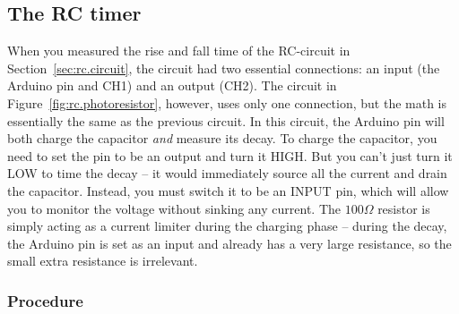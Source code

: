 \documentclass[11pt]{article} %
\begin{document}
\subsection*{The RC timer}

When you measured the rise and fall time of the RC-circuit in Section~\ref{sec:rc.circuit}, the circuit had two essential connections: an input (the Arduino pin and CH1) and an output (CH2). The circuit in Figure~\ref{fig:rc.photoresistor}, however, uses only one connection, but the math is essentially the same as the previous circuit. In this circuit, the Arduino pin will both charge the capacitor \emph{and} measure its decay. To charge the capacitor, you need to set the pin to be an output and turn it HIGH. But you can't just turn it LOW to time the decay -- it would immediately source all the current and drain the capacitor. Instead, you must switch it to be an INPUT pin, which will allow you to monitor the voltage without sinking any current. The $100\Omega$ resistor is simply acting as a current limiter during the charging phase -- during the decay, the Arduino pin is set as an input and already has a very large resistance, so the small extra resistance is irrelevant.


\subsubsection*{Procedure}
\end{document}
